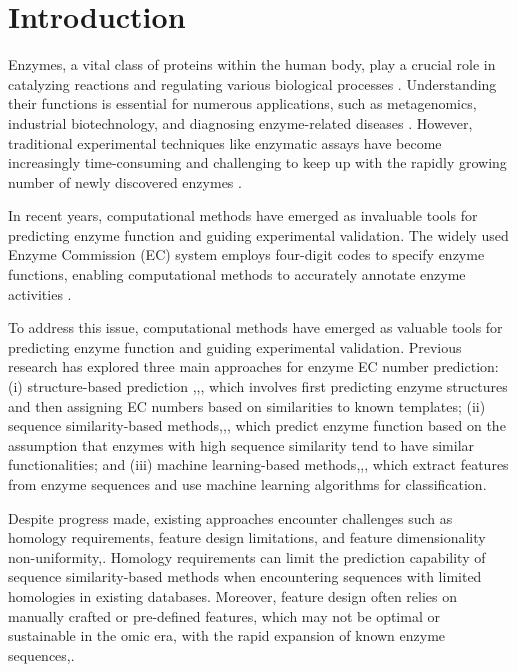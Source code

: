 \documentclass[conference]{IEEEtran}
\begin{document}
\section{Introduction}


Enzymes, a vital class of proteins within the human body, play a crucial role in catalyzing reactions and regulating various biological processes \cite{1}. Understanding their functions is essential for numerous applications, such as metagenomics, industrial biotechnology, and diagnosing enzyme-related diseases \cite{2}. However, traditional experimental techniques like enzymatic assays have become increasingly time-consuming and challenging to keep up with the rapidly growing number of newly discovered enzymes \cite{3}.

In recent years, computational methods have emerged as invaluable tools for predicting enzyme function and guiding experimental validation. The widely used Enzyme Commission (EC) system employs four-digit codes to specify enzyme functions, enabling computational methods to accurately annotate enzyme activities \cite{4}.

To address this issue, computational methods have emerged as valuable tools for predicting enzyme function and guiding experimental validation. Previous research \cite{5} has explored three main approaches for enzyme EC number prediction: (i) structure-based prediction \cite{6},\cite{7},\cite{8}, which involves first predicting enzyme structures and then assigning EC numbers based on similarities to known templates; (ii) sequence similarity-based methods\cite{9},\cite{10},\cite{11}, which predict enzyme function based on the assumption that enzymes with high sequence similarity tend to have similar functionalities; and (iii) machine learning-based methods\cite{12},\cite{13},\cite{14}, which extract features from enzyme sequences and use machine learning algorithms for classification.

Despite progress made, existing approaches encounter challenges such as homology requirements, feature design limitations, and feature dimensionality non-uniformity\cite{5},\cite{14}. Homology requirements can limit the prediction capability of sequence similarity-based methods when encountering sequences with limited homologies in existing databases\cite{15}. Moreover, feature design often relies on manually crafted or pre-defined features, which may not be optimal or sustainable in the omic era, with the rapid expansion of known enzyme sequences\cite{3},\cite{5}.
\end{document}
